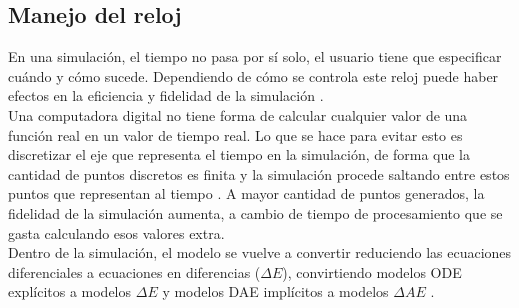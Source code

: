 \subsection{Manejo del reloj}

En una simulación, el tiempo no pasa por sí solo, el usuario tiene que especificar cuándo y cómo sucede. Dependiendo de cómo se controla este reloj puede haber efectos en la eficiencia y fidelidad de la simulación \cite{cellier2006}.\\

Una computadora digital no tiene forma de calcular cualquier valor de una función real en un valor de tiempo real. Lo que se hace para evitar esto es discretizar el eje que representa el tiempo en la simulación, de forma que la cantidad de puntos discretos es finita y la simulación procede saltando entre estos puntos que representan al tiempo \cite{cellier2006}. A mayor cantidad de puntos generados, la fidelidad de la simulación aumenta, a cambio de tiempo de procesamiento que se gasta calculando esos valores extra.\\

Dentro de la simulación, el modelo se vuelve a convertir reduciendo las ecuaciones diferenciales a ecuaciones en diferencias ($\Delta E$), convirtiendo modelos ODE explícitos a modelos  $\Delta E$ y modelos DAE implícitos a modelos $\Delta AE$ \cite{cellier2006}.\\





